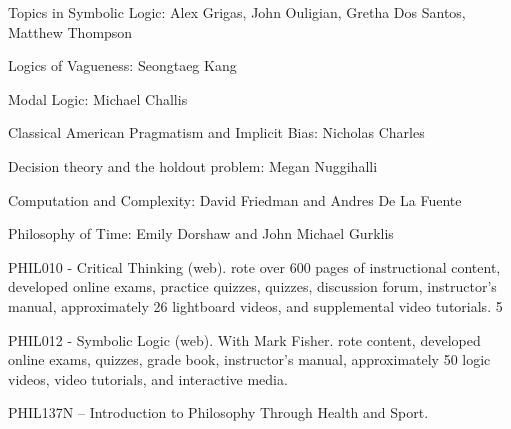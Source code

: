 \documentclass[p1noheader, 11pt, lightmode]{lightcv}
\begin{document}
\begin{rlist} 
\item Topics in Symbolic Logic: Alex Grigas, John Ouligian, Gretha Dos Santos, Matthew Thompson
\item Logics of Vagueness: Seongtaeg Kang
\item Modal Logic: Michael Challis
\item Classical American Pragmatism and Implicit Bias: Nicholas Charles
\item Decision theory and the holdout problem: Megan Nuggihalli
\item Computation and Complexity: David Friedman and Andres De La Fuente
\item Philosophy of Time: Emily Dorshaw and John Michael Gurklis
\end{rlist}

\begin{rlist}    
    \item PHIL010 - Critical Thinking (web). rote over 600 pages of instructional content, developed online
    exams, practice quizzes, quizzes, discussion forum, instructor’s manual, approximately
    26 lightboard videos, and supplemental video tutorials.
    5
    \item PHIL012 - Symbolic Logic (web). With Mark Fisher. rote content, developed online exams, quizzes,
    grade book, instructor’s manual, approximately 50 logic videos, video tutorials, and interactive media.    
    \item PHIL137N – Introduction to Philosophy Through Health and Sport.
\end{rlist}
\end{document}
